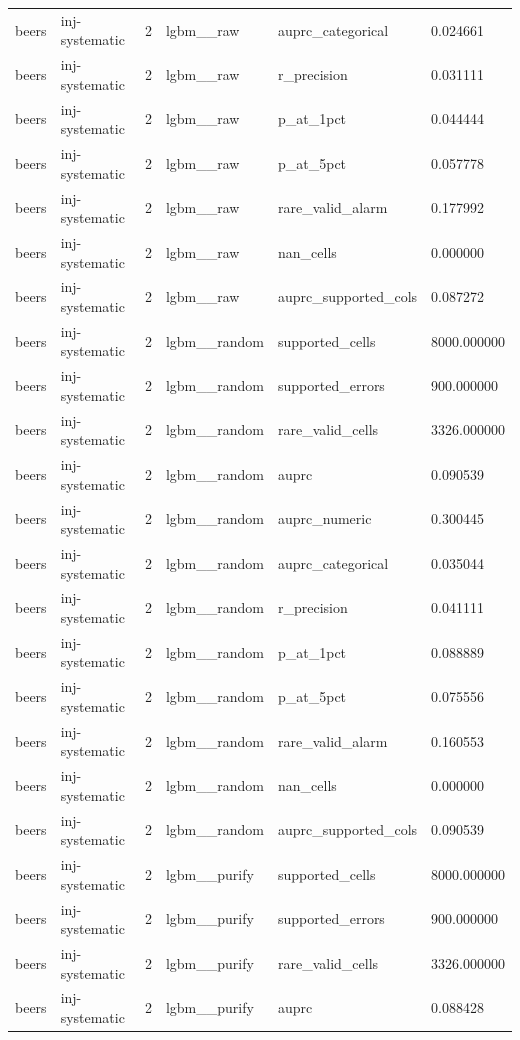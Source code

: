 \begin{tabular}{llllll}
beers & inj-systematic & 2 & lgbm\_\_raw & auprc\_categorical & 0.024661 \\
beers & inj-systematic & 2 & lgbm\_\_raw & r\_precision & 0.031111 \\
beers & inj-systematic & 2 & lgbm\_\_raw & p\_at\_1pct & 0.044444 \\
beers & inj-systematic & 2 & lgbm\_\_raw & p\_at\_5pct & 0.057778 \\
beers & inj-systematic & 2 & lgbm\_\_raw & rare\_valid\_alarm & 0.177992 \\
beers & inj-systematic & 2 & lgbm\_\_raw & nan\_cells & 0.000000 \\
beers & inj-systematic & 2 & lgbm\_\_raw & auprc\_supported\_cols & 0.087272 \\
beers & inj-systematic & 2 & lgbm\_\_random & supported\_cells & 8000.000000 \\
beers & inj-systematic & 2 & lgbm\_\_random & supported\_errors & 900.000000 \\
beers & inj-systematic & 2 & lgbm\_\_random & rare\_valid\_cells & 3326.000000 \\
beers & inj-systematic & 2 & lgbm\_\_random & auprc & 0.090539 \\
beers & inj-systematic & 2 & lgbm\_\_random & auprc\_numeric & 0.300445 \\
beers & inj-systematic & 2 & lgbm\_\_random & auprc\_categorical & 0.035044 \\
beers & inj-systematic & 2 & lgbm\_\_random & r\_precision & 0.041111 \\
beers & inj-systematic & 2 & lgbm\_\_random & p\_at\_1pct & 0.088889 \\
beers & inj-systematic & 2 & lgbm\_\_random & p\_at\_5pct & 0.075556 \\
beers & inj-systematic & 2 & lgbm\_\_random & rare\_valid\_alarm & 0.160553 \\
beers & inj-systematic & 2 & lgbm\_\_random & nan\_cells & 0.000000 \\
beers & inj-systematic & 2 & lgbm\_\_random & auprc\_supported\_cols & 0.090539 \\
beers & inj-systematic & 2 & lgbm\_\_purify & supported\_cells & 8000.000000 \\
beers & inj-systematic & 2 & lgbm\_\_purify & supported\_errors & 900.000000 \\
beers & inj-systematic & 2 & lgbm\_\_purify & rare\_valid\_cells & 3326.000000 \\
beers & inj-systematic & 2 & lgbm\_\_purify & auprc & 0.088428 \\

\end{tabular}
